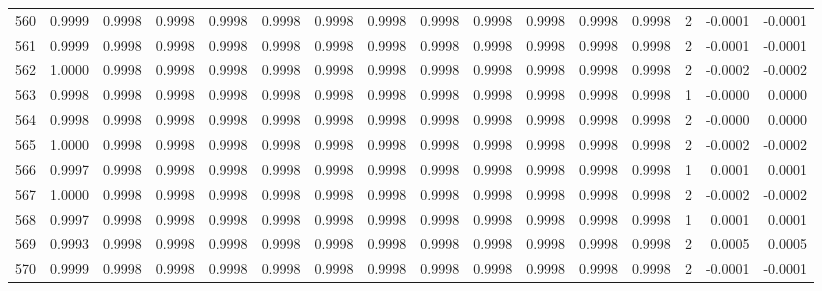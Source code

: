 \begin{tabular}{lrrrrrrrrrrrrrrr}
560 &      0.9999 &  0.9998 &  0.9998 &  0.9998 &  0.9998 &  0.9998 &  0.9998 &  0.9998 &  0.9998 &  0.9998 &   0.9998 &     0.9998 &      2 &                   -0.0001 &                    -0.0001 \\
561 &      0.9999 &  0.9998 &  0.9998 &  0.9998 &  0.9998 &  0.9998 &  0.9998 &  0.9998 &  0.9998 &  0.9998 &   0.9998 &     0.9998 &      2 &                   -0.0001 &                    -0.0001 \\
562 &      1.0000 &  0.9998 &  0.9998 &  0.9998 &  0.9998 &  0.9998 &  0.9998 &  0.9998 &  0.9998 &  0.9998 &   0.9998 &     0.9998 &      2 &                   -0.0002 &                    -0.0002 \\
563 &      0.9998 &  0.9998 &  0.9998 &  0.9998 &  0.9998 &  0.9998 &  0.9998 &  0.9998 &  0.9998 &  0.9998 &   0.9998 &     0.9998 &      1 &                   -0.0000 &                     0.0000 \\
564 &      0.9998 &  0.9998 &  0.9998 &  0.9998 &  0.9998 &  0.9998 &  0.9998 &  0.9998 &  0.9998 &  0.9998 &   0.9998 &     0.9998 &      2 &                   -0.0000 &                     0.0000 \\
565 &      1.0000 &  0.9998 &  0.9998 &  0.9998 &  0.9998 &  0.9998 &  0.9998 &  0.9998 &  0.9998 &  0.9998 &   0.9998 &     0.9998 &      2 &                   -0.0002 &                    -0.0002 \\
566 &      0.9997 &  0.9998 &  0.9998 &  0.9998 &  0.9998 &  0.9998 &  0.9998 &  0.9998 &  0.9998 &  0.9998 &   0.9998 &     0.9998 &      1 &                    0.0001 &                     0.0001 \\
567 &      1.0000 &  0.9998 &  0.9998 &  0.9998 &  0.9998 &  0.9998 &  0.9998 &  0.9998 &  0.9998 &  0.9998 &   0.9998 &     0.9998 &      2 &                   -0.0002 &                    -0.0002 \\
568 &      0.9997 &  0.9998 &  0.9998 &  0.9998 &  0.9998 &  0.9998 &  0.9998 &  0.9998 &  0.9998 &  0.9998 &   0.9998 &     0.9998 &      1 &                    0.0001 &                     0.0001 \\
569 &      0.9993 &  0.9998 &  0.9998 &  0.9998 &  0.9998 &  0.9998 &  0.9998 &  0.9998 &  0.9998 &  0.9998 &   0.9998 &     0.9998 &      2 &                    0.0005 &                     0.0005 \\
570 &      0.9999 &  0.9998 &  0.9998 &  0.9998 &  0.9998 &  0.9998 &  0.9998 &  0.9998 &  0.9998 &  0.9998 &   0.9998 &     0.9998 &      2 &                   -0.0001 &                    -0.0001 \\

\end{tabular}

